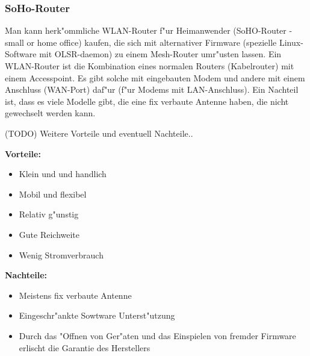 \subsubsection{SoHo-Router}

Man kann herk"ommliche WLAN-Router f"ur Heimanwender (SoHO-Router - small
or home office) kaufen, die sich mit alternativer Firmware (spezielle
Linux-Software mit OLSR-daemon) zu einem Mesh-Router umr"usten
lassen. Ein WLAN-Router ist die Kombination eines normalen Routers
(Kabelrouter) mit einem Accesspoint. Es gibt solche mit eingebauten
Modem und andere mit einem Anschluss (WAN-Port) daf"ur (f"ur Modems mit
LAN-Anschluss). Ein Nachteil ist, dass es viele Modelle gibt, die eine
fix verbaute Antenne haben, die nicht gewechselt werden kann.

(TODO) Weitere Vorteile und eventuell Nachteile..

\textbf{Vorteile:}

\begin{itemize}
	\item Klein und	und handlich
	\item Mobil und flexibel
	\item Relativ g"unstig
	\item Gute Reichweite
	\item Wenig Stromverbrauch 
\end{itemize}

\textbf{Nachteile:}

\begin{itemize}
	\item Meistens fix verbaute Antenne 
	\item Eingeschr"ankte Sowtware Unterst"utzung
	\item Durch das "Offnen von Ger"aten und das Einspielen von fremder Firmware
				erlischt die Garantie des Herstellers
\end{itemize}

